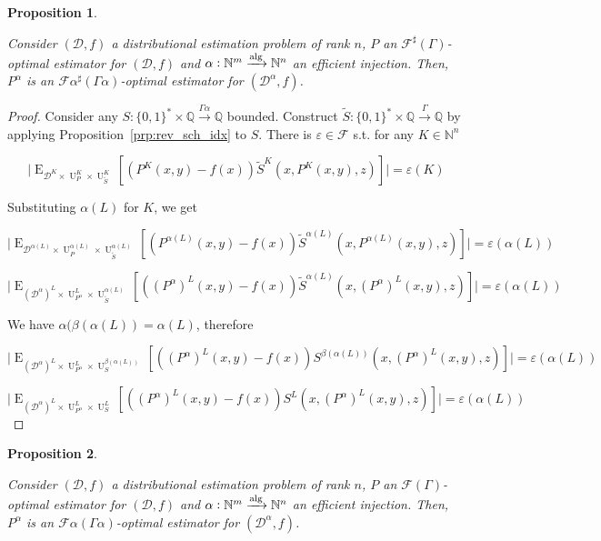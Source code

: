 \documentclass{article}
\numberwithin{equation}{section}
\theoremstyle{definition}
\theoremstyle{plain}
\newtheorem{proposition}{Proposition}[section]
\newcommand{\Bool}{\{0,1\}}
\newcommand{\Words}{{\Bool^*}}
\DeclareMathOperator{\E}{E}
\DeclareMathOperator{\Un}{U}
\newcommand{\Nats}{\mathbb{N}}
\newcommand{\Rats}{\mathbb{Q}}
\newcommand{\Abs}[1]{\lvert #1 \rvert}
\newcommand{\Dist}{\mathcal{D}}
\newcommand{\Fall}{\mathcal{F}}
\newcommand{\EG}{\Fall(\Gamma)}
\newcommand{\ESG}{\Fall^\sharp(\Gamma)}
\newcommand{\Alg}{\xrightarrow{\textnormal{alg}}}
\newcommand{\Scheme}{\xrightarrow{\Gamma}}
\begin{document}
\begin{samepage}
\begin{proposition}
\label{prp:idx_reduce_sharp}

Consider $(\Dist,f)$ a distributional estimation problem of rank ${n}$, ${P}$ an ${\ESG}$-optimal estimator for ${(\Dist,f)}$ and ${\alpha: \Nats^m \Alg \Nats^n}$ an efficient injection. Then, ${P^\alpha}$ is an ${\Fall \alpha^\sharp(\Gamma \alpha)}$-optimal estimator for ${(\Dist^\alpha,f)}$.

\end{proposition}
\end{samepage}

\begin{proof}

Consider any ${S: \Words \times \Rats \xrightarrow{\Gamma \alpha} \Rats}$ bounded. Construct ${\tilde{S}: \Words \times \Rats \Scheme \Rats}$ by applying Proposition~\ref{prp:rev_sch_idx} to ${S}$. There is ${\varepsilon \in \Fall}$ s.t. for any ${K \in \Nats^n}$

\[\Abs{\E_{\Dist^{K} \times \Un_P^K \times \Un_{\tilde{S}}^K}[(P^K(x,y) - f(x))\tilde{S}^K(x,P^K(x,y),z)]}=\varepsilon(K)\]

Substituting ${\alpha(L)}$ for ${K}$, we get

\[\Abs{\E_{\Dist^{\alpha(L)} \times \Un_P^{\alpha(L)} \times \Un_{\tilde{S}}^{\alpha(L)}}[(P^{\alpha(L)}(x,y) - f(x))\tilde{S}^{\alpha(L)}(x,P^{\alpha(L)}(x,y),z)]}=\varepsilon(\alpha(L))\]

\[\Abs{\E_{(\Dist^\alpha)^{L} \times \Un_{P^\alpha}^{L} \times \Un_{\tilde{S}}^{\alpha(L)}}[((P^\alpha)^{L}(x,y) - f(x))\tilde{S}^{\alpha(L)}(x,(P^\alpha)^{L}(x,y),z)]}=\varepsilon(\alpha(L))\]

We have ${\alpha(\beta(\alpha(L))=\alpha(L)}$, therefore

\[\Abs{\E_{(\Dist^\alpha)^{L} \times \Un_{P^\alpha}^{L} \times \Un_{S}^{\beta(\alpha(L))}}[((P^\alpha)^{L}(x,y) - f(x))S^{\beta(\alpha(L))}(x,(P^\alpha)^{L}(x,y),z)]}=\varepsilon(\alpha(L))\]

\[\Abs{\E_{(\Dist^\alpha)^{L} \times \Un_{P^\alpha}^{L} \times \Un_{S}^{L}}[((P^\alpha)^{L}(x,y) - f(x))S^{L}(x,(P^\alpha)^{L}(x,y),z)]}=\varepsilon(\alpha(L))\]
%
\end{proof}

\begin{samepage}
\begin{proposition}
\label{prp:idx_reduce}

Consider $(\Dist,f)$ a distributional estimation problem of rank ${n}$, ${P}$ an ${\EG}$-optimal estimator for ${(\Dist,f)}$ and ${\alpha: \Nats^m \Alg \Nats^n}$ an efficient injection. Then, ${P^\alpha}$ is an ${\Fall \alpha(\Gamma \alpha)}$-optimal estimator for ${(\Dist^\alpha,f)}$.

\end{proposition}
\end{samepage}
\end{document}
